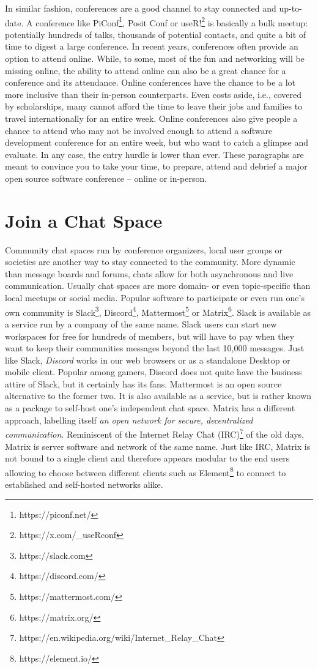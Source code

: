 \documentclass[
  12pt,
  letterpaper,
]{krantz}
\begin{document}
In similar fashion, conferences are a good channel to stay connected and
up-to-date. A conference like PiConf\footnote{https://piconf.net/},
Posit Conf or useR!\footnote{https://x.com/\_useRconf} is basically a
bulk meetup: potentially hundreds of talks, thousands of potential
contacts, and quite a bit of time to digest a large conference. In
recent years, conferences often provide an option to attend online.
While, to some, most of the fun and networking will be missing online,
the ability to attend online can also be a great chance for a conference
and its attendance. Online conferences have the chance to be a lot more
inclusive than their in-person counterparts. Even costs aside, i.e.,
covered by scholarships, many cannot afford the time to leave their jobs
and families to travel internationally for an entire week. Online
conferences also give people a chance to attend who may not be involved
enough to attend a software development conference for an entire week,
but who want to catch a glimpse and evaluate. In any case, the entry
hurdle is lower than ever. These paragraphs are meant to convince you to
take your time, to prepare, attend and debrief a major open source
software conference -- online or in-person.

\hypertarget{join-a-chat-space}{%
\section{Join a Chat Space}\label{join-a-chat-space}}

Community chat spaces run by conference organizers, local user groups or
societies are another way to stay connected to the community. More
dynamic than message boards and forums, chats allow for both
asynchronous and live communication. Usually chat spaces are more
domain- or even topic-specific than local meetups or social media.
Popular software to participate or even run one's own community is
Slack\footnote{https://slack.com}, Discord\footnote{https://discord.com/},
Mattermost\footnote{https://mattermost.com/} or Matrix\footnote{https://matrix.org/}.
Slack is available as a service run by a company of the same name. Slack
users can start new workspaces for free for hundreds of members, but
will have to pay when they want to keep their communities messages
beyond the last 10,000 messages. Just like Slack, \emph{Discord} works
in our web browsers or as a standalone Desktop or mobile client. Popular
among gamers, Discord does not quite have the business attire of Slack,
but it certainly has its fans. Mattermost is an open source alternative
to the former two. It is also available as a service, but is rather
known as a package to self-host one's independent chat space. Matrix has
a different approach, labelling itself \emph{an open network for secure,
decentralized communication}. Reminiscent of the Internet Relay Chat
(IRC)\footnote{https://en.wikipedia.org/wiki/Internet\_Relay\_Chat} of
the old days, Matrix is server software and network of the same name.
Just like IRC, Matrix is not bound to a single client and therefore
appears modular to the end users allowing to choose between different
clients such as Element\footnote{https://element.io/} to connect to
established and self-hosted networks alike.
\end{document}
